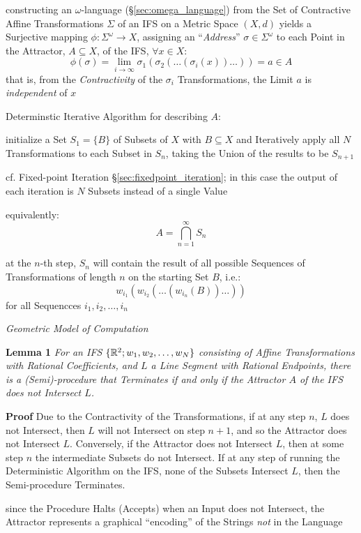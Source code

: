 constructing an $\omega$-language (\S\ref{sec:omega_language}) from the Set of
Contractive Affine Transformations $\Sigma$ of an IFS on a Metric Space $(X, d)$
yields a Surjective mapping $\phi : \Sigma^\omega \rightarrow X$, assigning an
``\emph{Address}'' $\sigma \in \Sigma^\omega$ to each Point in the Attractor,
$A \subseteq X$, of the IFS, $\forall x \in X$:
\[
  \phi(\sigma) =
    \lim_{i \rightarrow \infty} \sigma_1(\sigma_2(\ldots(\sigma_i(x))\ldots)) =
    a \in A
\]
that is, from the \emph{Contractivity} of the $\sigma_i$ Transformations, the
Limit $a$ is \emph{independent} of $x$

Determinstic Iterative Algorithm for describing $A$:

initialize a Set $S_1 = \{ B \}$ of Subsets of $X$ with $B \subseteq X$ and
Iteratively apply all $N$ Transformations to each Subset in $S_n$, taking the
Union of the results to be $S_{n+1}$

cf. Fixed-point Iteration \S\ref{sec:fixedpoint_iteration}; in this case the
output of each iteration is $N$ Subsets instead of a single Value

equivalently:
\[
  A = \bigcap_{n=1}^{\infty} S_n
\]

at the $n$-th step, $S_n$ will contain the result of all possible Sequences of
Transformations of length $n$ on the starting Set $B$, i.e.:
\[
  w_{i_1}(w_{i_2}(\ldots(w_{i_n}(B))\ldots))
\]
for all Sequencces $i_1, i_2, \ldots, i_n$

\emph{Geometric Model of Computation}

\textbf{Lemma 1} \emph{
 For an IFS $\{\mathbb{R}^2; w_1, w_2, \ldots, w_N\}$ consisting of Affine
 Transformations with Rational Coefficients, and $L$ a Line Segment with
 Rational Endpoints, there is a (Semi)-procedure that Terminates if and only if
 the Attractor $A$ of the IFS does not Intersect $L$.
}

\textbf{Proof} Due to the Contractivity of the Transformations, if at any step
$n$, $L$ does not Intersect, then $L$ will not Intersect on step $n+1$, and so
the Attractor does not Intersect $L$. Conversely, if the Attractor does not
Intersect $L$, then at some step $n$ the intermediate Subsets do not Intersect.
If at any step of running the Deterministic Algorithm on the IFS, none of the
Subsets Intersect $L$, then the Semi-procedure Terminates.

since the Procedure Halts (Accepts) when an Input does not Intersect, the
Attractor represents a graphical ``encoding'' of the Strings \emph{not} in the
Language

